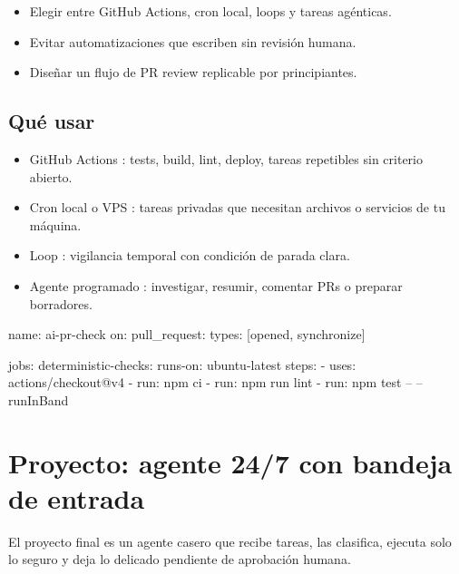 \documentclass[11pt,a4paper]{book}
\begin{document}
\begin{itemize}\item Elegir entre GitHub Actions, cron local, loops y tareas agénticas.\end{itemize}
\begin{itemize}\item Evitar automatizaciones que escriben sin revisión humana.\end{itemize}
\begin{itemize}\item Diseñar un flujo de PR review replicable por principiantes.\end{itemize}
\section{Qué usar}
\begin{itemize}\item GitHub Actions : tests, build, lint, deploy, tareas repetibles sin criterio abierto.\end{itemize}
\begin{itemize}\item Cron local o VPS : tareas privadas que necesitan archivos o servicios de tu máquina.\end{itemize}
\begin{itemize}\item Loop : vigilancia temporal con condición de parada clara.\end{itemize}
\begin{itemize}\item Agente programado : investigar, resumir, comentar PRs o preparar borradores.\end{itemize}
\begin{codebox}
name: ai-pr-check
on:
  pull_request:
    types: [opened, synchronize]

jobs:
  deterministic-checks:
    runs-on: ubuntu-latest
    steps:
      - uses: actions/checkout@v4
      - run: npm ci
      - run: npm run lint
      - run: npm test -- --runInBand
\end{codebox}
\chapter{Proyecto: agente 24/7 con bandeja de entrada}
El proyecto final es un agente casero que recibe tareas, las clasifica, ejecuta solo lo seguro y deja lo delicado pendiente de aprobación humana.
\end{document}
